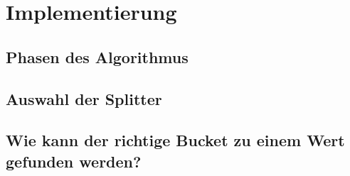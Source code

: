 \section{Implementierung}

\subsection{Phasen des Algorithmus}


\subsection{Auswahl der Splitter}


\subsection{Wie kann der richtige Bucket zu einem Wert gefunden werden?}

